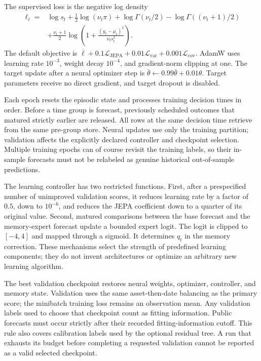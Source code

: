 \documentclass[11pt,a4paper]{article}
\begin{document}
The supervised loss is the negative log density
\begin{align}
\ell_t={}&\log s_t+\tfrac12\log(\nu_t\pi)+\log\Gamma(\nu_t/2)-\log\Gamma((\nu_t+1)/2)\\
&+\tfrac{\nu_t+1}{2}\log\left(1+\frac{(y_t-\mu_t)^2}{\nu_ts_t^2}\right).
\end{align}
The default objective is $\overline\ell+0.1\mathcal L_{\mathrm{JEPA}}+0.01\mathcal L_{\mathrm{var}}+0.001\mathcal L_{\mathrm{cov}}$. AdamW uses learning rate $10^{-3}$, weight decay $10^{-4}$, and gradient-norm clipping at one. The target update after a neural optimizer step is $\bar\theta\leftarrow0.99\bar\theta+0.01\theta$. Target parameters receive no direct gradient, and target dropout is disabled.

Each epoch resets the episodic state and processes training decision times in order. Before a time group is forecast, previously scheduled outcomes that matured strictly earlier are released. All rows at the same decision time retrieve from the same pre-group store. Neural updates use only the training partition; validation affects the explicitly declared controller and checkpoint selection. Multiple training epochs can of course revisit the training labels, so their in-sample forecasts must not be relabeled as genuine historical out-of-sample predictions.

The learning controller has two restricted functions. First, after a prespecified number of unimproved validation scores, it reduces learning rate by a factor of $0.5$, down to $10^{-6}$, and reduces the JEPA coefficient down to a quarter of its original value. Second, matured comparisons between the base forecast and the memory-expert forecast update a bounded expert logit. The logit is clipped to $[-4,4]$ and mapped through a sigmoid. It determines $q_t$ in the memory correction. These mechanisms select the strength of predefined learning components; they do not invent architectures or optimize an arbitrary new learning algorithm.

The best validation checkpoint restores neural weights, optimizer, controller, and memory state. Validation uses the same asset-then-date balancing as the primary score; the minibatch training loss remains an observation mean. Any validation labels used to choose that checkpoint count as fitting information. Public forecasts must occur strictly after their recorded fitting-information cutoff. This rule also covers calibration labels used by the optional residual tree. A run that exhausts its budget before completing a requested validation cannot be reported as a valid selected checkpoint.
\end{document}
